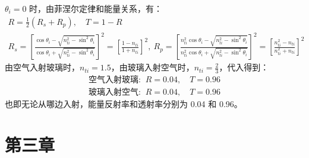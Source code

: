 \documentclass[UTF8]{report}
\theoremstyle{MyLineTheoremStyle} %
\theoremstyle{MyBlockTheoremStyle} %
\theoremstyle{MySubsubsectionStyle} %
\begin{document}
$\theta_i = 0$ 时，由菲涅尔定律和能量关系，有：
\begin{gather}
    R =  \frac{1}{2}(R_s + R_p),\quad  T = 1 - R\\ 
    R_s =  \left[ \frac{ \cos \theta_i - \sqrt{n_{ti}^2 - \sin^2 \theta_i} }{\cos \theta_i + \sqrt{n_{ti}^2 - \sin^2 \theta_i}} \right]^2 = \left[ \frac{1 - n_{ti}}{1 + n_{ti}} \right]^2,\ R_p = \left[ \frac{ n_{ti}^2\cos \theta_i - \sqrt{n_{ti}^2 - \sin^2 \theta_i} }{n_{ti}^2\cos \theta_i + \sqrt{n_{ti}^2 - \sin^2 \theta_i}} \right]^2 =  \left[ \frac{n_{ti}^2 - n_{ti}}{n_{ti}^2 + n_{ti}} \right]^2
\end{gather}
由空气入射玻璃时，$n_{ti} = 1.5$，由玻璃入射空气时，$n_{ti} = \frac{2}{3}$，代入得到：
\begin{gather*}
\text{空气入射玻璃: }\ R = 0.04,\quad  T = 0.96 \\ 
\text{玻璃入射空气: }\ R = 0.04,\quad  T = 0.96 
\end{gather*}
也即无论从哪边入射，能量反射率和透射率分别为 0.04 和 0.96。


\chapter{第三章}\thispagestyle{fancy}



















\newpage
\appendix
\titleformat{\chapter}[hang]{\normalfont\huge\bfseries\centering}{}{20pt}{}
\titlespacing*{\chapter}{0pt}{-25pt}{8pt} %
\titleformat{\section}[hang]{\normalfont\centering\Large\bfseries}{\thesection}{8pt}{}
\end{document}
